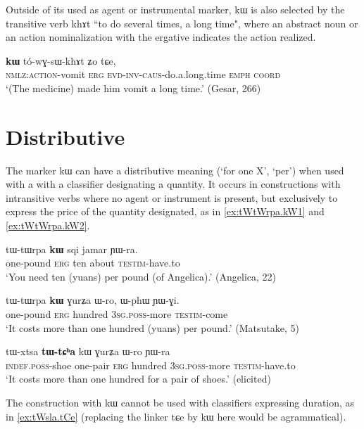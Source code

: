 \documentclass[oldfontcommands,oneside,a4paper,11pt]{article}
\newcommand{\ipa}[1]{{\phon #1}} %
\begin{document}
 
 

 Outside of its used as agent or instrumental marker, \ipa{kɯ} is also selected by the transitive verb \ipa{khɤt} ``to do several times, a long time", where an abstract noun or an action nominalization with the ergative indicates the action realized.
 \begin{exe} 
\ex \label{ex:instr5}
\gll   \ipa{tɯ-qioʁ}   	\ipa{\textbf{kɯ}}   	\ipa{tó-wɣ-sɯ-khɤt}   	\ipa{ʑo}   	\ipa{tɕe,}       \\
  \textsc{nmlz:action}-vomit \textsc{erg} \textsc{evd-inv-caus}-do.a.long.time \textsc{emph} \textsc{coord}\\
 \glt  `(The medicine) made him vomit a long time.' (Gesar, 266)
\end{exe}  
 
 
\section{Distributive} \label{sec:distributive}
The marker \ipa{kɯ} can have   a distributive meaning (`for one X', `per') when used with a with a classifier designating a quantity. It occurs  in constructions with intransitive verbs where no agent or instrument is present, but exclusively to express the price of the quantity designated, as in  \ref{ex:tWtWrpa.kW1} and \ref{ex:tWtWrpa.kW2}.

 \begin{exe} 
\ex \label{ex:tWtWrpa.kW1}
\gll  
\ipa{tɯ-tɯrpa} 	\ipa{\textbf{kɯ}} 	\ipa{sqi} 	\ipa{jamar} 	\ipa{ɲɯ-ra.} 	\\
one-pound \textsc{erg} ten about \textsc{testim}-have.to \\
\glt `You need ten (yuans) per pound (of Angelica).' (Angelica, 22)
\end{exe}  

 \begin{exe} 
\ex \label{ex:tWtWrpa.kW2}
\gll  
\ipa{tɯ-tɯrpa}  	\ipa{\textbf{kɯ}}  	\ipa{ɣurʑa}  	\ipa{ɯ-ro,}  	\ipa{ɯ-phɯ}  	\ipa{ɲɯ-ɣi.}  \\
one-pound \textsc{erg} hundred \textsc{3sg.poss}-more \textsc{testim}-come \\
\glt `It costs more than one hundred (yuans) per pound.' (Matsutake, 5)
\end{exe}  
  \begin{exe} 
\ex \label{ex:tWtCha.kW}
\gll  
\ipa{tɯ-xtsa} 	\ipa{\textbf{tɯ-tɕʰa}} 	\ipa{kɯ} 	\ipa{ɣurʑa} 	\ipa{ɯ-ro} 	\ipa{ɲɯ-ra} \\
\textsc{indef.poss}-shoe one-pair \textsc{erg} hundred \textsc{3sg.poss}-more \textsc{testim}-have.to \\
 \glt  `It costs more than one hundred for a pair of shoes.' (elicited)
\end{exe}  
The construction with \ipa{kɯ} cannot be used with classifiers expressing duration, as in \ref{ex:tWsla.tCe} (replacing the linker \ipa{tɕe} by \ipa{kɯ} here would be agrammatical).
 
\end{document}
